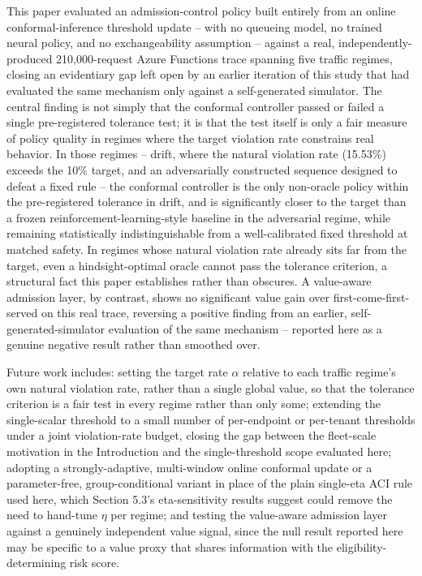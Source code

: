 \documentclass[11pt,letterpaper]{article}
\begin{document}
This paper evaluated an admission-control policy built entirely from an online conformal-inference threshold update -- with no queueing model, no trained neural policy, and no exchangeability assumption -- against a real, independently-produced 210,000-request Azure Functions trace spanning five traffic regimes, closing an evidentiary gap left open by an earlier iteration of this study that had evaluated the same mechanism only against a self-generated simulator. The central finding is not simply that the conformal controller passed or failed a single pre-registered tolerance test; it is that the test itself is only a fair measure of policy quality in regimes where the target violation rate constrains real behavior. In those regimes -- drift, where the natural violation rate (15.53\%) exceeds the 10\% target, and an adversarially constructed sequence designed to defeat a fixed rule -- the conformal controller is the only non-oracle policy within the pre-registered tolerance in drift, and is significantly closer to the target than a frozen reinforcement-learning-style baseline in the adversarial regime, while remaining statistically indistinguishable from a well-calibrated fixed threshold at matched safety. In regimes whose natural violation rate already sits far from the target, even a hindsight-optimal oracle cannot pass the tolerance criterion, a structural fact this paper establishes rather than obscures. A value-aware admission layer, by contrast, shows no significant value gain over first-come-first-served on this real trace, reversing a positive finding from an earlier, self-generated-simulator evaluation of the same mechanism -- reported here as a genuine negative result rather than smoothed over.

Future work includes: setting the target rate $\alpha$ relative to each traffic regime's own natural violation rate, rather than a single global value, so that the tolerance criterion is a fair test in every regime rather than only some; extending the single-scalar threshold to a small number of per-endpoint or per-tenant thresholds under a joint violation-rate budget, closing the gap between the fleet-scale motivation in the Introduction and the single-threshold scope evaluated here; adopting a strongly-adaptive, multi-window online conformal update \citep{Bhatnagar2023} or a parameter-free, group-conditional variant \citep{Bharti2026} in place of the plain single-eta ACI rule used here, which Section 5.3's eta-sensitivity results suggest could remove the need to hand-tune $\eta$ per regime; and testing the value-aware admission layer against a genuinely independent value signal, since the null result reported here may be specific to a value proxy that shares information with the eligibility-determining risk score.



\end{document}
